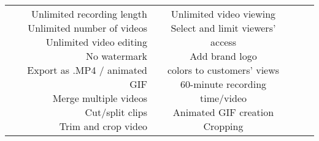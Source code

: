 \documentclass[paper=letter, fontsize=12pt]{article}
\begin{document}
\begin{table}[H]
\begin{tabular}{r | c | c | c }
			\makecell[l]{
				Unlimited recording length
				\\ Unlimited number of videos
				\\ Unlimited video editing
				\\ No watermark
				\\ Export as .MP4 / animated GIF
				\\ Merge multiple videos
				\\ Cut/split clips
				\\ Trim and crop video
			} & 
			\makecell[l]{
				Unlimited video viewing
				\\ Select and limit viewers' access
				\\ Add brand logo
				\\ colors to customers’ views
				\\ 60-minute recording time/video
				\\ Animated GIF creation
				\\ Cropping
			} & 
			\makecell[l]{
				f
			}
		\end{tabular}
	\end{table}
	
\end{document}
